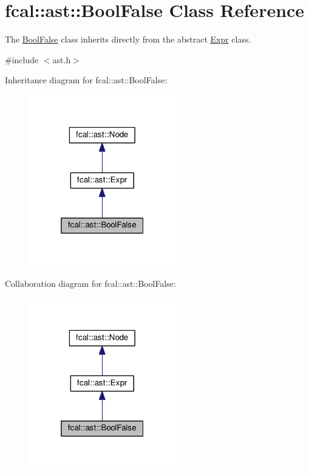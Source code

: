\hypertarget{classfcal_1_1ast_1_1BoolFalse}{}\section{fcal\+:\+:ast\+:\+:Bool\+False Class Reference}
\label{classfcal_1_1ast_1_1BoolFalse}


The \hyperlink{classfcal_1_1ast_1_1BoolFalse}{Bool\+False} class inherits directly from the abstract \hyperlink{classfcal_1_1ast_1_1Expr}{Expr} class.  




{\ttfamily \#include $<$ast.\+h$>$}



Inheritance diagram for fcal\+:\+:ast\+:\+:Bool\+False\+:
\nopagebreak
\begin{figure}[H]
\begin{center}
\leavevmode
\includegraphics[width=181pt]{classfcal_1_1ast_1_1BoolFalse__inherit__graph}
\end{center}
\end{figure}


Collaboration diagram for fcal\+:\+:ast\+:\+:Bool\+False\+:
\nopagebreak
\begin{figure}[H]
\begin{center}
\leavevmode
\includegraphics[width=181pt]{classfcal_1_1ast_1_1BoolFalse__coll__graph}
\end{center}
\end{figure}
